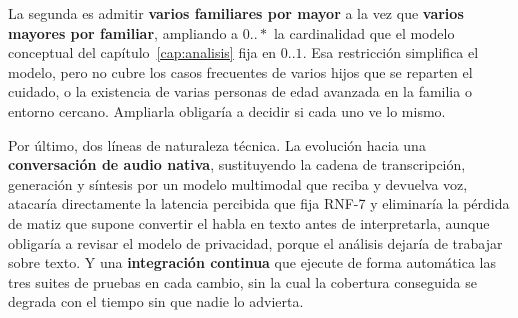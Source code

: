 La segunda es admitir \textbf{varios familiares por mayor} a la vez que \textbf{varios mayores por familiar}, ampliando a $0..*$ la cardinalidad que el modelo conceptual del capítulo~\ref{cap:analisis} fija en $0..1$. Esa restricción simplifica el modelo, pero no cubre los casos frecuentes de varios hijos que se reparten el cuidado, o la existencia de varias personas de edad avanzada en la familia o entorno cercano. Ampliarla obligaría a decidir si cada uno ve lo mismo.

Por último, dos líneas de naturaleza técnica. La evolución hacia una \textbf{conversación de audio nativa}, sustituyendo la cadena de transcripción, generación y síntesis por un modelo multimodal que reciba y devuelva voz, atacaría directamente la latencia percibida que fija RNF-7 y eliminaría la pérdida de matiz que supone convertir el habla en texto antes de interpretarla, aunque obligaría a revisar el modelo de privacidad, porque el análisis dejaría de trabajar sobre texto. Y una \textbf{integración continua} que ejecute de forma automática las tres suites de pruebas en cada cambio, sin la cual la cobertura conseguida se degrada con el tiempo sin que nadie lo advierta.

